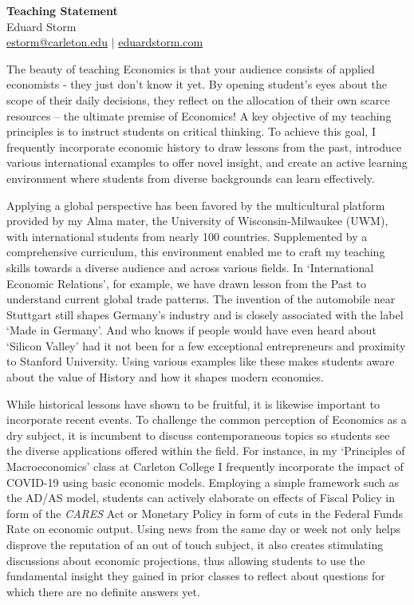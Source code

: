 \documentclass[a4paper,12pt]{article}
\begin{document}
\thispagestyle{plain}

\begin{center}
 {\Large \textbf{Teaching Statement}} \\
 Eduard Storm \\
 \href{mailto:estorm@carleton.edu}{estorm@carleton.edu} $|$ \href{https://eduardstorm.com/}{eduardstorm.com}
\end{center}
The beauty of teaching Economics is that your audience consists of applied economists - they just don’t know it yet. By opening student’s eyes about the scope of their daily decisions, they reflect on the allocation of their own scarce resources – the ultimate premise of Economics!  A key objective of my teaching principles is to instruct students on critical thinking. To achieve this goal, I frequently incorporate economic history to draw lessons from the past, introduce various international examples to offer novel insight, and create an active learning environment where students from diverse backgrounds can learn effectively. 

Applying a global perspective has been favored by the multicultural platform provided by my Alma mater, the University of Wisconsin-Milwaukee (UWM), with international students from nearly 100 countries. Supplemented by a comprehensive curriculum, this environment enabled me to craft my teaching skills towards a diverse audience and across various fields. In `International Economic Relations', for example, we have drawn lesson from the Past to understand current global trade patterns. The invention of the automobile near Stuttgart still shapes Germany's industry and is closely associated with the label `Made in Germany'. And who knows if people would have even heard about `Silicon Valley' had it not been for a few exceptional entrepreneurs and proximity to Stanford University. Using various examples like these makes students aware about the value of History and how it shapes modern economies. 

While historical lessons have shown to be fruitful, it is likewise important to incorporate recent events. To challenge the common perception of Economics as a dry subject, it is incumbent to discuss contemporaneous topics so students see the diverse applications offered within the field. For instance, in my `Principles of Macroeconomics' class at Carleton College I frequently incorporate the impact of COVID-19 using basic economic models. Employing a simple framework such as the AD/AS model, students can actively elaborate on effects of Fiscal Policy in form of the \textit{CARES} Act or Monetary Policy in form of cuts in the Federal Funds Rate on economic output. Using news from the same day or week not only helps disprove the reputation of an out of touch  subject, it also creates stimulating discussions about economic projections, thus allowing students to use the fundamental insight they gained in prior classes to reflect about questions for which there are no definite answers yet. 
\end{document}
